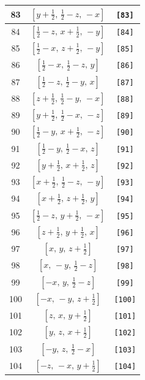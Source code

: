 \documentclass[fleqn,8pt]{jsarticle}
\begin{document}
\begin{longtable}{ccc}
83 & $\left[ y + \frac{1}{2},\, \frac{1}{2} - z,\, - x \right]$ & {\tt [83]} \\ \hline
84 & $\left[ \frac{1}{2} - z,\, x + \frac{1}{2},\, - y \right]$ & {\tt [84]} \\ \hline
85 & $\left[ \frac{1}{2} - x,\, z + \frac{1}{2},\, - y \right]$ & {\tt [85]} \\ \hline
86 & $\left[ \frac{1}{2} - x,\, \frac{1}{2} - z,\, y \right]$ & {\tt [86]} \\ \hline
87 & $\left[ \frac{1}{2} - z,\, \frac{1}{2} - y,\, x \right]$ & {\tt [87]} \\ \hline
88 & $\left[ z + \frac{1}{2},\, \frac{1}{2} - y,\, - x \right]$ & {\tt [88]} \\ \hline
89 & $\left[ y + \frac{1}{2},\, \frac{1}{2} - x,\, - z \right]$ & {\tt [89]} \\ \hline
90 & $\left[ \frac{1}{2} - y,\, x + \frac{1}{2},\, - z \right]$ & {\tt [90]} \\ \hline
91 & $\left[ \frac{1}{2} - y,\, \frac{1}{2} - x,\, z \right]$ & {\tt [91]} \\ \hline
92 & $\left[ y + \frac{1}{2},\, x + \frac{1}{2},\, z \right]$ & {\tt [92]} \\ \hline
93 & $\left[ x + \frac{1}{2},\, \frac{1}{2} - z,\, - y \right]$ & {\tt [93]} \\ \hline
94 & $\left[ x + \frac{1}{2},\, z + \frac{1}{2},\, y \right]$ & {\tt [94]} \\ \hline
95 & $\left[ \frac{1}{2} - z,\, y + \frac{1}{2},\, - x \right]$ & {\tt [95]} \\ \hline
96 & $\left[ z + \frac{1}{2},\, y + \frac{1}{2},\, x \right]$ & {\tt [96]} \\ \hline
97 & $\left[ x,\, y,\, z + \frac{1}{2} \right]$ & {\tt [97]} \\ \hline
98 & $\left[ x,\, - y,\, \frac{1}{2} - z \right]$ & {\tt [98]} \\ \hline
99 & $\left[ - x,\, y,\, \frac{1}{2} - z \right]$ & {\tt [99]} \\ \hline
100 & $\left[ - x,\, - y,\, z + \frac{1}{2} \right]$ & {\tt [100]} \\ \hline
101 & $\left[ z,\, x,\, y + \frac{1}{2} \right]$ & {\tt [101]} \\ \hline
102 & $\left[ y,\, z,\, x + \frac{1}{2} \right]$ & {\tt [102]} \\ \hline
103 & $\left[ - y,\, z,\, \frac{1}{2} - x \right]$ & {\tt [103]} \\ \hline
104 & $\left[ - z,\, - x,\, y + \frac{1}{2} \right]$ & {\tt [104]} \\ \hline

\end{longtable}
\end{document}
